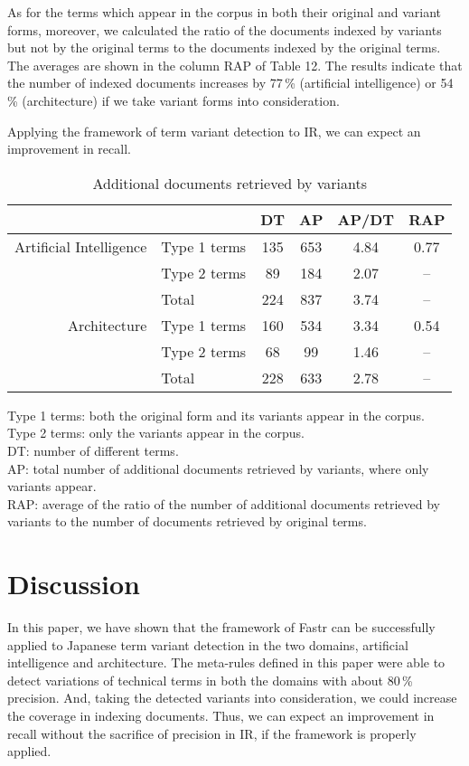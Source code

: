 As for the terms which appear in the corpus in both their original and variant forms, moreover, we calculated the ratio of the documents indexed by variants but not by the original terms to the documents indexed by the original terms. The averages are shown in the column RAP of Table 12. The results indicate that the number of indexed documents increases by 77\,\% (artificial intelligence) or 54\,\% (architecture) if we take variant forms into consideration.

Applying the framework of term variant detection to IR, we can expect an improvement in recall.

\begin{table}[htb]
\begin{center}
\begin{tabular}{rl|c|cc|c}
\hline
& & DT & AP & AP/DT & RAP\\
\hline
\hline
Artificial Intelligence & Type 1 terms & 135 & 653 & 4.84 & 0.77\\
& Type 2 terms & 89 & 184 & 2.07 & --\\
\hline
& Total & 224 & 837 & 3.74 & --\\
\hline
\hline
Architecture & Type 1 terms & 160 & 534 & 3.34 & 0.54\\
& Type 2 terms & 68 & 99 & 1.46 & --\\
\hline
& Total & 228 & 633 & 2.78 & --\\
\hline
\end{tabular}
\end{center}
{\footnotesize
Type 1 terms: both the original form and its variants appear in the corpus.\\
Type 2 terms: only the variants appear in the corpus.\\
DT: number of different terms.\\
AP: total number of additional documents retrieved by variants, where only variants appear.\\
RAP: average of the ratio of the number of additional documents retrieved by variants to the number of documents retrieved by original terms.
}
\caption{Additional documents retrieved by variants}
\end{table}

\section{Discussion}

In this paper, we have shown that the framework of Fastr can be successfully applied to Japanese term variant detection in the two domains, artificial intelligence and architecture. The meta-rules defined in this paper were able to detect variations of technical terms in both the domains with about 80\,\% precision. And, taking the detected variants into consideration, we could increase the coverage in indexing documents. Thus, we can expect an improvement in recall without the sacrifice of precision in IR, if the framework is properly applied.

